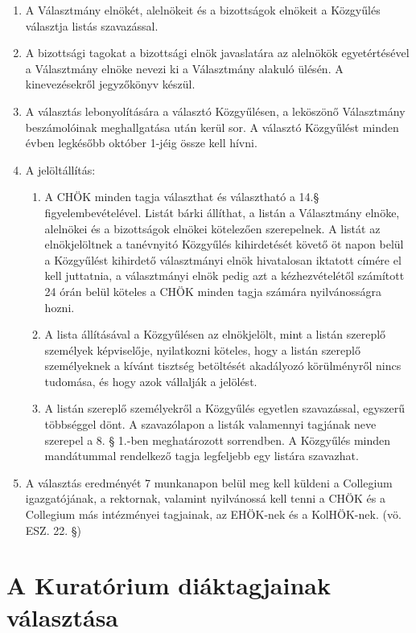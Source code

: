 \documentclass{../styles/rulebook}
\begin{document}
\begin{enumerate}
	\item A Választmány elnökét, alelnökeit és a bizottságok elnökeit a Közgyűlés választja listás szavazással.
	\item A bizottsági tagokat a bizottsági elnök javaslatára az alelnökök egyetértésével a Választmány elnöke nevezi ki a Választmány alakuló ülésén. A kinevezésekről jegyzőkönyv készül.
	\item A választás lebonyolítására a választó Közgyűlésen, a leköszönő Választmány beszámolóinak meghallgatása után kerül sor. A választó Közgyűlést minden évben legkésőbb október 1-jéig össze kell hívni.
	\item A jelöltállítás:
	\begin{enumerate}
		\item A CHÖK minden tagja választhat és választható a 14.§ figyelembevételével. Listát bárki állíthat, a listán a Választmány elnöke, alelnökei és a bizottságok elnökei kötelezően szerepelnek. A listát az elnökjelöltnek a tanévnyitó Közgyűlés kihirdetését követő öt napon belül a Közgyűlést kihirdető választmányi elnök hivatalosan iktatott címére el kell juttatnia, a választmányi elnök pedig azt a kézhezvételétől számított 24 órán belül köteles a CHÖK minden tagja számára nyilvánosságra hozni.
		\item A lista állításával a Közgyűlésen az elnökjelölt, mint a listán szereplő személyek képviselője, nyilatkozni köteles, hogy a listán szereplő személyeknek a kívánt tisztség betöltését akadályozó körülményről nincs tudomása, és hogy azok vállalják a jelölést.
		\item A listán szereplő személyekről a Közgyűlés egyetlen szavazással, egyszerű többséggel dönt. A szavazólapon a listák valamennyi tagjának neve szerepel a 8. § 1.-ben meghatározott sorrendben. A Közgyűlés minden mandátummal rendelkező tagja legfeljebb egy listára szavazhat.
	\end{enumerate}
	\item A választás eredményét 7 munkanapon belül meg kell küldeni a Collegium igazgatójának, a rektornak, valamint nyilvánossá kell tenni a CHÖK és a Collegium más intézményei tagjainak, az EHÖK-nek és a KolHÖK-nek. (vö. ESZ. 22. §)
\end{enumerate}


\section{A Kuratórium diáktagjainak választása}
\end{document}

